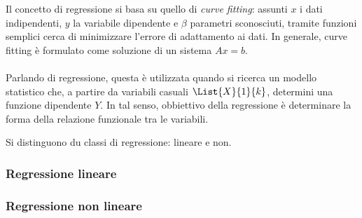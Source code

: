 \documentclass{subfiles}
\begin{document}
Il concetto di regressione si basa su quello di \emph{curve fitting}: assunti \(x\) i dati indipendenti,
\(y\) la variabile dipendente e \(\beta\) parametri sconosciuti, tramite funzioni semplici cerca di minimizzare l'errore di adattamento ai dati.
In generale, curve fitting è formulato come soluzione di un sistema \(Ax = b\).
\\ \\
Parlando di regressione, questa è utilizzata quando si ricerca un modello statistico che, a partire da variabili casuali \(\List{X}{1}{k}\),
determini una funzione dipendente \(Y\).
In tal senso, obbiettivo della regressione è determinare la forma della relazione funzionale tra le variabili.

Si distinguono du classi di regressione: lineare e non.

\subsubsection{Regressione lineare}


\subsubsection{Regressione non lineare}

\end{document}
